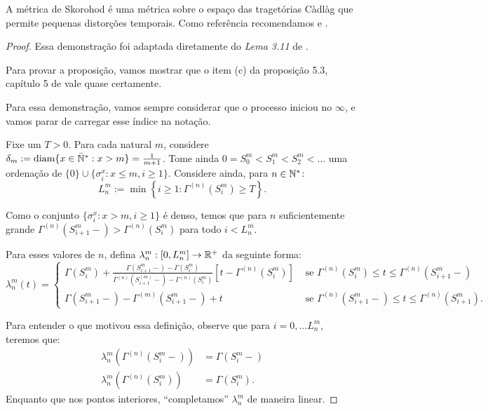 A métrica de Skorohod é uma métrica sobre o espaço das tragetórias
Càdlàg que permite pequenas distorções temporais. Como
referência recomendamos \cite{billingsley:99} e \cite{ethier:86}.


\begin{proof}
  Essa demonstração foi adaptada diretamente do \emph{Lema 3.11} de
  \cite{fontes:08}.

  Para provar a proposição, vamos mostrar que o item (c) da proposição
  5.3, capítulo 5 de \cite{ethier:86} vale quase certamente.

  Para essa demonstração, vamos sempre considerar que o processo
  iniciou no $\infty$, e vamos parar de carregar esse índice na notação.

  Fixe um $T > 0$. Para cada natural $m$, considere $\delta_m :=
  {\mathrm{diam}}\{ x \in {\mathbb{\bar{N}^*}}: x > m \} = \frac{1}{m+1}$. Tome ainda $0 = S_0^m
  < S_1^m < S_2^m < \ldots $ uma ordenação de $\{0\}\cup\{ \sigma^x_i
  : x \leq m, i \geq 1\}$. Considere ainda, para $n \in {\mathbb{N^*}}$:
  \begin{displaymath}
    L^m_n := \min \left\{ i \geq 1: \Gamma^{(n)}(S^m_i) \geq T \right\}.
  \end{displaymath}

  Como o conjunto $\{\sigma_i^x: x > m, i\geq 1\}$ é denso, temos
  que para $n$ suficientemente grande $\Gamma^{(n)}(S^m_{i+1}-) >
  \Gamma^{(n)}(S^m_i)$ para todo $i < L^m_n$.

  Para esses valores de $n$, defina $\lambda_n^m: [0, L_n^m] \to {\mathbb{R}}^+$
  da seguinte forma:
  \begin{displaymath}
    \lambda_n^m(t) = \begin{cases}
      \Gamma(S_i^m) + \frac{\Gamma(S_{i+1}^m-) - \Gamma(S_i^m)}
      {\Gamma^{(n)}(S_{i+1}^{(m)} -) - \Gamma^{(n)}(S_i^m)}
      \left[t - \Gamma^{(n)}(S_i^m)\right]
      & \textrm{ se }
      \Gamma^{(n)}(S_i^m) \leq t \leq \Gamma^{(n)}(S_{i+1}^m-) \\
      \Gamma(S_{i+1}^m-) - \Gamma^{(m)}(S_{i+1}^m-) + t
      & \textrm{ se }
      \Gamma^{(n)}(S_{i+1}^m-) \leq t \leq \Gamma^{(n)}(S_{i+1}^m).
    \end{cases}
  \end{displaymath}

  Para entender o que motivou essa definição, observe que para $i = 0,
  \ldots L_n^m$, teremos que:
  \begin{align*}
    \lambda_n^m(\Gamma^{(n)}(S_i^m-)) &= \Gamma(S_i^m-)\\
    \lambda_n^m(\Gamma^{(n)}(S_i^m)) &= \Gamma(S_i^m).
  \end{align*}
  Enquanto que nos pontos interiores, ``completamos'' $\lambda_n^m$ de
  maneira linear.


\end{proof}
